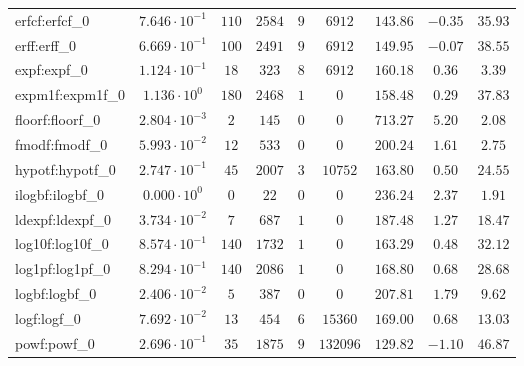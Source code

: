 \begin{tabular}{|l|c|c|c|c|c|c|c|c|}
erfcf:erfcf\_0               & $ 7.646 \cdot 10^{-1} $ & $ 110    $ & $ 2584  $ & $ 9   $ & $ 6912   $ & $ 143.86      $ & $ -0.35   $ & $ 35.93   $ \\
erff:erff\_0                 & $ 6.669 \cdot 10^{-1} $ & $ 100    $ & $ 2491  $ & $ 9   $ & $ 6912   $ & $ 149.95      $ & $ -0.07   $ & $ 38.55   $ \\
expf:expf\_0                 & $ 1.124 \cdot 10^{-1} $ & $ 18     $ & $ 323   $ & $ 8   $ & $ 6912   $ & $ 160.18      $ & $ 0.36    $ & $ 3.39    $ \\
expm1f:expm1f\_0             & $ 1.136 \cdot 10^{0}  $ & $ 180    $ & $ 2468  $ & $ 1   $ & $ 0      $ & $ 158.48      $ & $ 0.29    $ & $ 37.83   $ \\
floorf:floorf\_0             & $ 2.804 \cdot 10^{-3} $ & $ 2      $ & $ 145   $ & $ 0   $ & $ 0      $ & $ 713.27      $ & $ 5.20    $ & $ 2.08    $ \\
fmodf:fmodf\_0               & $ 5.993 \cdot 10^{-2} $ & $ 12     $ & $ 533   $ & $ 0   $ & $ 0      $ & $ 200.24      $ & $ 1.61    $ & $ 2.75    $ \\
hypotf:hypotf\_0             & $ 2.747 \cdot 10^{-1} $ & $ 45     $ & $ 2007  $ & $ 3   $ & $ 10752  $ & $ 163.80      $ & $ 0.50    $ & $ 24.55   $ \\
ilogbf:ilogbf\_0             & $ 0.000 \cdot 10^{0}  $ & $ 0      $ & $ 22    $ & $ 0   $ & $ 0      $ & $ 236.24      $ & $ 2.37    $ & $ 1.91    $ \\
ldexpf:ldexpf\_0             & $ 3.734 \cdot 10^{-2} $ & $ 7      $ & $ 687   $ & $ 1   $ & $ 0      $ & $ 187.48      $ & $ 1.27    $ & $ 18.47   $ \\
log10f:log10f\_0             & $ 8.574 \cdot 10^{-1} $ & $ 140    $ & $ 1732  $ & $ 1   $ & $ 0      $ & $ 163.29      $ & $ 0.48    $ & $ 32.12   $ \\
log1pf:log1pf\_0             & $ 8.294 \cdot 10^{-1} $ & $ 140    $ & $ 2086  $ & $ 1   $ & $ 0      $ & $ 168.80      $ & $ 0.68    $ & $ 28.68   $ \\
logbf:logbf\_0               & $ 2.406 \cdot 10^{-2} $ & $ 5      $ & $ 387   $ & $ 0   $ & $ 0      $ & $ 207.81      $ & $ 1.79    $ & $ 9.62    $ \\
logf:logf\_0                 & $ 7.692 \cdot 10^{-2} $ & $ 13     $ & $ 454   $ & $ 6   $ & $ 15360  $ & $ 169.00      $ & $ 0.68    $ & $ 13.03   $ \\
powf:powf\_0                 & $ 2.696 \cdot 10^{-1} $ & $ 35     $ & $ 1875  $ & $ 9   $ & $ 132096 $ & $ 129.82      $ & $ -1.10   $ & $ 46.87   $ \\

\end{tabular}
